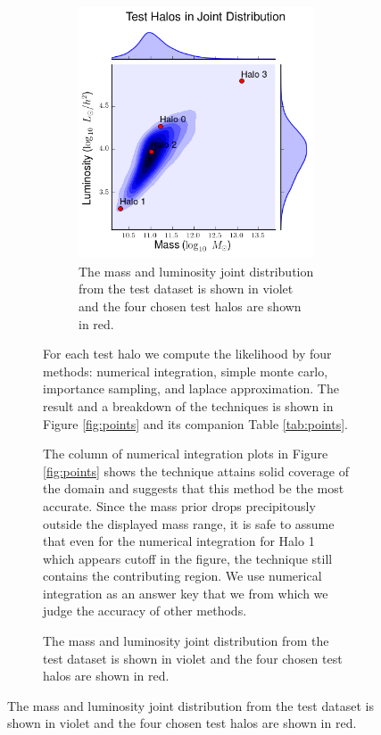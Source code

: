 \documentclass[\docopts]{\docclass}
\begin{document}
\begin{figure}[h!]
\begin{figure}[h!]
\begin{figure}[!h]
\centering
\includegraphics[width=1.0\columnwidth]{joint.png}
\caption{
The mass and luminosity joint distribution from the test dataset is shown in violet and the four chosen test halos are shown in red. 
\label{fig:joint}}
\end{figure}

For each test halo we compute the likelihood by four methods: numerical integration, simple monte carlo, importance sampling, and laplace approximation. The result and a breakdown of the techniques is shown in Figure \ref{fig:points} and its companion Table \ref{tab:points}.

The column of numerical integration plots in Figure \ref{fig:points} shows the technique attains solid coverage of the domain and suggests that this method be the most accurate. 
Since the mass prior drops precipitously outside the displayed mass range, it is safe to assume that even for the numerical integration for Halo 1 which appears cutoff in the figure, the technique still contains the contributing region.
We use numerical integration as an answer key that we from which we judge the accuracy of other methods. 


\end{figure}
\end{figure}
\end{document}
